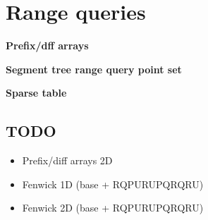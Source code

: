 \section{Range queries}
    \textbf{Prefix/dff arrays}
    

    \textbf{Segment tree range query point set}
    

    \textbf{Sparse table}
    

    \subsection{TODO}
    \begin{itemize}
        \item Prefix/diff arrays 2D
        \item Fenwick 1D (base + RQPU\/RUPQ\/RQRU)
        \item Fenwick 2D (base + RQPU\/RUPQ\/RQRU)
    \end{itemize}